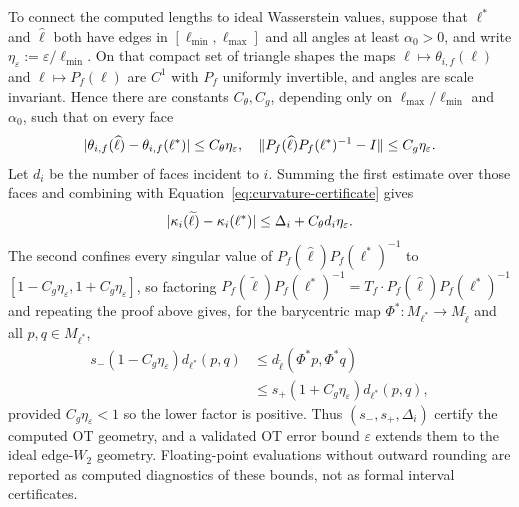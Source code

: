 To connect the computed lengths to ideal Wasserstein values, suppose that
$\ell^*$ and $\widehat\ell$ both have edges in $[\ell_{\min},\ell_{\max}]$ and
all angles at least $\alpha_0>0$, and write
$\eta_\varepsilon:=\varepsilon/\ell_{\min}$.  On that compact set of triangle
shapes the maps $\ell\mapsto\theta_{i,f}(\ell)$ and $\ell\mapsto P_f(\ell)$
are $C^1$ with $P_f$ uniformly invertible, and angles are scale invariant.
Hence there are constants $C_\theta,C_g$, depending only on
$\ell_{\max}/\ell_{\min}$ and $\alpha_0$, such that on every face
\begin{equation}
 \lvert \theta_{i,f}(\widehat\ell)-\theta_{i,f}(\ell^*)\rvert
 \le C_\theta\eta_\varepsilon,
 \quad
 \lVert P_f(\widehat\ell)P_f(\ell^*)^{-1}-I\rVert
 \le C_g\eta_\varepsilon.
 \label{eq:ot-perturbation}
\end{equation}
Let $d_i$ be the number of faces incident to $i$.  Summing the first estimate
over those faces and combining with
Equation~\eqref{eq:curvature-certificate} gives
\begin{equation}
 \lvert \kappa_i(\widetilde\ell)-\kappa_i(\ell^*)\rvert
 \le \Delta_i+C_\theta d_i\eta_\varepsilon.
 \label{eq:ideal-curvature-certificate}
\end{equation}
The second confines every singular value of
$P_f(\widehat\ell)P_f(\ell^*)^{-1}$ to
$[1-C_g\eta_\varepsilon,1+C_g\eta_\varepsilon]$, so factoring
$P_f(\widetilde\ell)P_f(\ell^*)^{-1}
=T_f\cdot P_f(\widehat\ell)P_f(\ell^*)^{-1}$ and repeating the proof above
gives, for the barycentric map $\Phi^*:M_{\ell^*}\to M_{\widetilde\ell}$ and
all $p,q\in M_{\ell^*}$,
\begin{equation}
 \begin{aligned}
 s_-(1-C_g\eta_\varepsilon)d_{\ell^*}(p,q)
 &\le d_{\widetilde\ell}(\Phi^*p,\Phi^*q)\\
 &\le s_+(1+C_g\eta_\varepsilon)d_{\ell^*}(p,q),
 \end{aligned}
 \label{eq:ideal-distance-certificate}
\end{equation}
provided $C_g\eta_\varepsilon<1$ so the lower factor is positive.  Thus
$(s_-,s_+,\Delta_i)$ certify the computed OT geometry, and a validated OT
error bound $\varepsilon$ extends them to the ideal edge-$W_2$ geometry.
Floating-point evaluations without outward rounding are reported as computed
diagnostics of these bounds, not as formal interval certificates.

